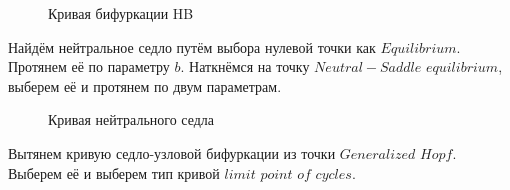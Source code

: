 \documentclass[12pt, a4paper]{article}
\begin{document}
\begin{figure}[H]
	\caption{Кривая бифуркации HB}
\end{figure}

Найдём нейтральное седло путём выбора нулевой точки как $Equilibrium$. Протянем её по параметру $b$. Наткнёмся на точку $Neutral-Saddle$ $equilibrium$, выберем её и протянем по двум параметрам.

\begin{figure}[H]
	\caption{Кривая нейтрального седла}
\end{figure}

Вытянем кривую седло-узловой бифуркации из точки $Generalized$ $Hopf$. Выберем её и выберем тип кривой $limit$ $point$ $of$ $cycles$.
\end{document}
